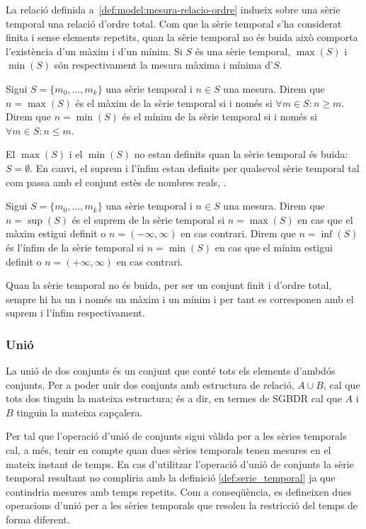 La relació definida a~\ref{def:model:mesura-relacio-ordre} indueix
sobre una sèrie temporal una relació d'ordre total. Com que la sèrie
temporal s'ha considerat finita i sense elements repetits, quan la
sèrie temporal no és buida això comporta l'existència d'un màxim i
d'un mínim.  Si $S$ és una sèrie temporal, $\max(S)$ i $\min(S)$ són
respectivament la mesura màxima i mínima d'$S$.

\begin{definition}
  Sigui $S=\{m_0,\ldots,m_k\}$ una sèrie temporal i $n\in S$ una
  mesura.  Direm que $n=\max(S)$ és el màxim de la sèrie temporal si i
  només si $\forall m \in S: n \geq m $.  Direm que $n=\min(S)$ és el
  mínim de la sèrie temporal si i només si $\forall m \in S: n \leq
  m$.
\end{definition}

El $\max(S)$ i el $\min(S)$ no estan definits quan la sèrie temporal
és buida: $S= \emptyset$. En
canvi, el suprem i l'ínfim estan definits per qualsevol
sèrie temporal tal com passa amb el conjunt estès de nombres reals,
\cite{cantrell:extendedreal}.  

\begin{definition}\label{def:sgst:sup}\label{def:sgst:inf}
  Sigui $S=\{m_0,\ldots,m_k\}$ una sèrie temporal i $n\in S$ una
  mesura.  Direm que $n=\sup(S)$ és el suprem de la sèrie temporal si
  $n=\max(S)$ en cas que el màxim estigui definit o
  $n=(-\infty,\infty)$ en cas contrari.  Direm que $n=\inf(S)$ és
  l'ínfim de la sèrie temporal si $n=\min(S)$ en cas que el mínim
  estigui definit o $n=(+\infty,\infty)$ en cas contrari.
\end{definition}

Quan la sèrie temporal no és buida, per
ser un conjunt finit i d'ordre total, sempre hi ha un i només un màxim
i un mínim i per tant es corresponen amb el suprem i l'ínfim
respectivament.




\subsubsection{Unió}

La unió de dos conjunts és un conjunt que conté tots els elements
d'ambdós conjunts.  Per a poder unir dos conjunts amb estructura de
relació, $A \cup B$, cal que tots dos tinguin la mateixa estructura;
és a dir, en termes de SGBDR cal que $A$ i $B$ tinguin la mateixa
capçalera.

Per tal que l'operació d'unió de conjunts sigui vàlida per a les
sèries temporals cal, a més, tenir en compte quan dues sèries
temporals tenen mesures en el mateix instant de temps. En cas
d'utilitzar l'operació d'unió de conjunts la sèrie temporal resultant
no compliria amb la definició \ref{def:serie_temporal} ja que
contindria mesures amb temps repetits. Com a conseqüència, es
defineixen dues operacions d'unió per a les sèries temporals que
resolen la restricció del temps de forma diferent.

